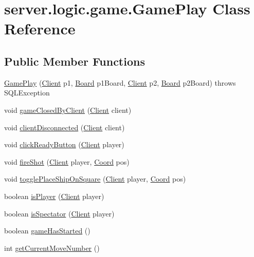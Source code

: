 \hypertarget{classserver_1_1logic_1_1game_1_1_game_play}{}\section{server.\+logic.\+game.\+Game\+Play Class Reference}
\label{classserver_1_1logic_1_1game_1_1_game_play}
\subsection*{Public Member Functions}
\begin{DoxyCompactItemize}
\item 
\hyperlink{classserver_1_1logic_1_1game_1_1_game_play_a8efd8226ecefa07db8fcaaec65b810bd}{Game\+Play} (\hyperlink{classserver_1_1conn_1_1_client}{Client} p1, \hyperlink{classserver_1_1logic_1_1game_1_1_board}{Board} p1\+Board, \hyperlink{classserver_1_1conn_1_1_client}{Client} p2, \hyperlink{classserver_1_1logic_1_1game_1_1_board}{Board} p2\+Board)  throws S\+Q\+L\+Exception 
\item 
void \hyperlink{classserver_1_1logic_1_1game_1_1_game_play_a7cab0c261d2f0df0dcb3aa6245b40ada}{game\+Closed\+By\+Client} (\hyperlink{classserver_1_1conn_1_1_client}{Client} client)
\item 
void \hyperlink{classserver_1_1logic_1_1game_1_1_game_play_a45c1b20f210822845ab753b2fdc2dd89}{client\+Disconnected} (\hyperlink{classserver_1_1conn_1_1_client}{Client} client)
\item 
void \hyperlink{classserver_1_1logic_1_1game_1_1_game_play_ae630a7fdd6c0f8fbf518ffa28e91d5fb}{click\+Ready\+Button} (\hyperlink{classserver_1_1conn_1_1_client}{Client} player)
\item 
void \hyperlink{classserver_1_1logic_1_1game_1_1_game_play_a3976c3d5e4c1b82cdffc28857e8c0a20}{fire\+Shot} (\hyperlink{classserver_1_1conn_1_1_client}{Client} player, \hyperlink{classsharedlib_1_1utils_1_1_coord}{Coord} pos)
\item 
void \hyperlink{classserver_1_1logic_1_1game_1_1_game_play_a9f34dca51847af3cd06cc36cf8f101d5}{toggle\+Place\+Ship\+On\+Square} (\hyperlink{classserver_1_1conn_1_1_client}{Client} player, \hyperlink{classsharedlib_1_1utils_1_1_coord}{Coord} pos)
\item 
boolean \hyperlink{classserver_1_1logic_1_1game_1_1_game_play_adbf208846bbafa06fbd86f5addfe171f}{is\+Player} (\hyperlink{classserver_1_1conn_1_1_client}{Client} player)
\item 
boolean \hyperlink{classserver_1_1logic_1_1game_1_1_game_play_a52b83e1a247f4c20456d88319e90c48c}{is\+Spectator} (\hyperlink{classserver_1_1conn_1_1_client}{Client} player)
\item 
boolean \hyperlink{classserver_1_1logic_1_1game_1_1_game_play_aa4469a87744a6771f37f82267180b222}{game\+Has\+Started} ()
\item 
int \hyperlink{classserver_1_1logic_1_1game_1_1_game_play_a43686e264eac3183ad9df3e9ce675178}{get\+Current\+Move\+Number} ()
\end{DoxyCompactItemize}
